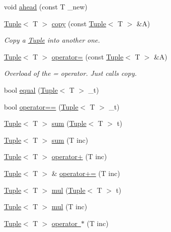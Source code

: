 \begin{DoxyCompactItemize}
void \mbox{\hyperlink{class_tuple_a1173bba1687b01721f9e4e4c73de0d2a}{ahead}} (const T \+\_\+new)
\item 
\mbox{\hyperlink{class_tuple}{Tuple}}$<$ T $>$ \mbox{\hyperlink{class_tuple_ac4b525e02b40a646ebd4f600fe78d00f}{copy}} (const \mbox{\hyperlink{class_tuple}{Tuple}}$<$ T $>$ \&A)
\begin{DoxyCompactList}\small\item\em Copy a \mbox{\hyperlink{class_tuple}{Tuple}} into another one. \end{DoxyCompactList}\item 
\mbox{\hyperlink{class_tuple}{Tuple}}$<$ T $>$ \mbox{\hyperlink{class_tuple_ab47559b59159610317779405337c2b44}{operator=}} (const \mbox{\hyperlink{class_tuple}{Tuple}}$<$ T $>$ \&A)
\begin{DoxyCompactList}\small\item\em Overload of the = operator. Just calls {\ttfamily copy}. \end{DoxyCompactList}\item 
bool \mbox{\hyperlink{class_tuple_a68d1d3aaecc187f8f78b46f4e1b48260}{equal}} (\mbox{\hyperlink{class_tuple}{Tuple}}$<$ T $>$ \+\_\+t)
\item 
bool \mbox{\hyperlink{class_tuple_ad8f90a7c0726fae5ac5651c4e16222cd}{operator==}} (\mbox{\hyperlink{class_tuple}{Tuple}}$<$ T $>$ \+\_\+t)
\item 
\mbox{\hyperlink{class_tuple}{Tuple}}$<$ T $>$ \mbox{\hyperlink{class_tuple_a2b595ce33576c6fcb36d74b46f0a7c55}{sum}} (\mbox{\hyperlink{class_tuple}{Tuple}}$<$ T $>$ t)
\item 
\mbox{\hyperlink{class_tuple}{Tuple}}$<$ T $>$ \mbox{\hyperlink{class_tuple_a20daa0804e2bac28949b5abe0cbcc589}{sum}} (T inc)
\item 
\mbox{\hyperlink{class_tuple}{Tuple}}$<$ T $>$ \mbox{\hyperlink{class_tuple_af41b573429ba5d8fc0b5576b7b41e818}{operator+}} (T inc)
\item 
\mbox{\hyperlink{class_tuple}{Tuple}}$<$ T $>$ \& \mbox{\hyperlink{class_tuple_aeace0f594f48529ddf3385cb2f023daf}{operator+=}} (T inc)
\item 
\mbox{\hyperlink{class_tuple}{Tuple}}$<$ T $>$ \mbox{\hyperlink{class_tuple_aa04cadf68dd3658943db047b6fd500fa}{mul}} (\mbox{\hyperlink{class_tuple}{Tuple}}$<$ T $>$ t)
\item 
\mbox{\hyperlink{class_tuple}{Tuple}}$<$ T $>$ \mbox{\hyperlink{class_tuple_ad1de2e1ba86734fb751897138707a603}{mul}} (T inc)
\item 
\mbox{\hyperlink{class_tuple}{Tuple}}$<$ T $>$ \mbox{\hyperlink{class_tuple_ab5bd095731feb7aa39bcf41778eb144f}{operator $\ast$}} (T inc)

\end{DoxyCompactItemize}
